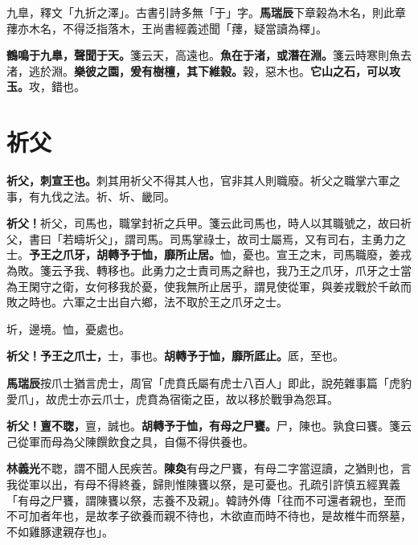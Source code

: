 \begin{quoting}九臯，釋文「九折之澤」。古書引詩多無「于」字。\textbf{馬瑞辰}下章榖為木名，則此章蘀亦木名，不得泛指落木，王尚書經義述聞「蘀，疑當讀為檡」。\end{quoting}

\textbf{鶴鳴于九臯，聲聞于天。}{\footnotesize 箋云天，高遠也。}\textbf{魚在于渚，或潛在淵。}{\footnotesize 箋云時寒則魚去渚，逃於淵。}\textbf{樂彼之園，爰有樹檀，其下維榖。}{\footnotesize 榖，惡木也。}\textbf{它山之石，可以攻玉。}{\footnotesize 攻，錯也。}

\section{祈父}


\textbf{祈父，刺宣王也。}{\footnotesize 刺其用祈父不得其人也，官非其人則職廢。祈父之職掌六軍之事，有九伐之法。祈、圻、畿同。}

\textbf{祈父！}{\footnotesize 祈父，司馬也，職掌封祈之兵甲。箋云此司馬也，時人以其職號之，故曰祈父，書曰「若疇圻父」，謂司馬。司馬掌祿士，故司士屬焉，又有司右，主勇力之士。}\textbf{予王之爪牙，胡轉予于恤，靡所止居。}{\footnotesize 恤，憂也。宣王之末，司馬職廢，姜戎為敗。箋云予我、轉移也。此勇力之士責司馬之辭也，我乃王之爪牙，爪牙之士當為王閑守之衛，女何移我於憂，使我無所止居乎，謂見使從軍，與姜戎戰於千畝而敗之時也。六軍之士出自六鄉，法不取於王之爪牙之士。}

\begin{quoting}圻，邊境。恤，憂處也。\end{quoting}

\textbf{祈父！予王之爪士，}{\footnotesize 士，事也。}\textbf{胡轉予于恤，靡所厎止。}{\footnotesize 厎，至也。}

\begin{quoting}\textbf{馬瑞辰}按爪士猶言虎士，周官「虎賁氏屬有虎士八百人」即此，說苑雜事篇「虎豹愛爪」，故虎士亦云爪士，虎賁為宿衛之臣，故以移於戰爭為怨耳。\end{quoting}

\textbf{祈父！亶不聦，}{\footnotesize 亶，誠也。}\textbf{胡轉予于恤，有母之尸饔。}{\footnotesize 尸，陳也。孰食曰饔。箋云己從軍而母為父陳饌飲食之具，自傷不得供養也。}

\begin{quoting}\textbf{林義光}不聦，謂不聞人民疾苦。\textbf{陳奐}有母之尸饔，有母二字當逗讀，之猶則也，言我從軍以出，有母不得終養，歸則惟陳饔以祭，是可憂也。孔疏引許慎五經異義「有母之尸饔，謂陳饔以祭，志養不及親」。韓詩外傳「往而不可還者親也，至而不可加者年也，是故孝子欲養而親不待也，木欲直而時不待也，是故椎牛而祭墓，不如雞豚逮親存也」。\end{quoting}

